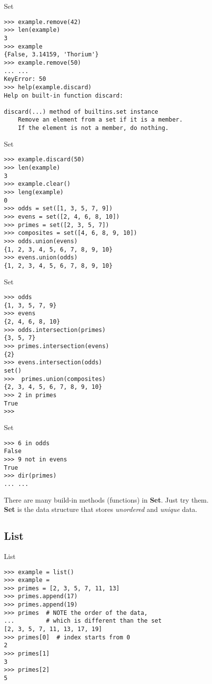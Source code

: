 \documentclass{beamer}
\begin{document}
\begin{frame}[fragile]{Set}
\begin{verbatim}
>>> example.remove(42)
>>> len(example)
3
>>> example
{False, 3.14159, 'Thorium'}
>>> example.remove(50)
... ...
KeyError: 50
>>> help(example.discard)
Help on built-in function discard:

discard(...) method of builtins.set instance
    Remove an element from a set if it is a member.
    If the element is not a member, do nothing.
\end{verbatim}
\end{frame}

\begin{frame}[fragile]{Set}
\begin{verbatim}
>>> example.discard(50)
>>> len(example)
3
>>> example.clear()
>>> leng(example)
0
>>> odds = set([1, 3, 5, 7, 9])
>>> evens = set([2, 4, 6, 8, 10])
>>> primes = set([2, 3, 5, 7])
>>> composites = set([4, 6, 8, 9, 10])
>>> odds.union(evens)
{1, 2, 3, 4, 5, 6, 7, 8, 9, 10}
>>> evens.union(odds)
{1, 2, 3, 4, 5, 6, 7, 8, 9, 10}
\end{verbatim}
\end{frame}

\begin{frame}[fragile]{Set}
\begin{verbatim}
>>> odds
{1, 3, 5, 7, 9}
>>> evens
{2, 4, 6, 8, 10}
>>> odds.intersection(primes)
{3, 5, 7}
>>> primes.intersection(evens)
{2}
>>> evens.intersection(odds)
set()
>>>  primes.union(composites)
{2, 3, 4, 5, 6, 7, 8, 9, 10}
>>> 2 in primes
True
>>>
\end{verbatim}
\end{frame}

\begin{frame}[fragile]{Set}
\begin{verbatim}
>>> 6 in odds
False
>>> 9 not in evens
True
>>> dir(primes)
... ...
\end{verbatim}

There are many build-in methods (functions) in \textbf{Set}. Just try them.\\
\textbf{Set} is the data structure that stores \textit{unordered} and \textit{unique} data.
\end{frame}

\subsection{List}

\begin{frame}[fragile]{List}
\begin{verbatim}
>>> example = list()
>>> example = 
>>> primes = [2, 3, 5, 7, 11, 13]
>>> primes.append(17)
>>> primes.append(19)
>>> primes  # NOTE the order of the data, 
...         # which is different than the set
[2, 3, 5, 7, 11, 13, 17, 19]
>>> primes[0]  # index starts from 0
2
>>> primes[1]
3
>>> primes[2]
5
\end{verbatim}
\end{frame}
\end{document}
